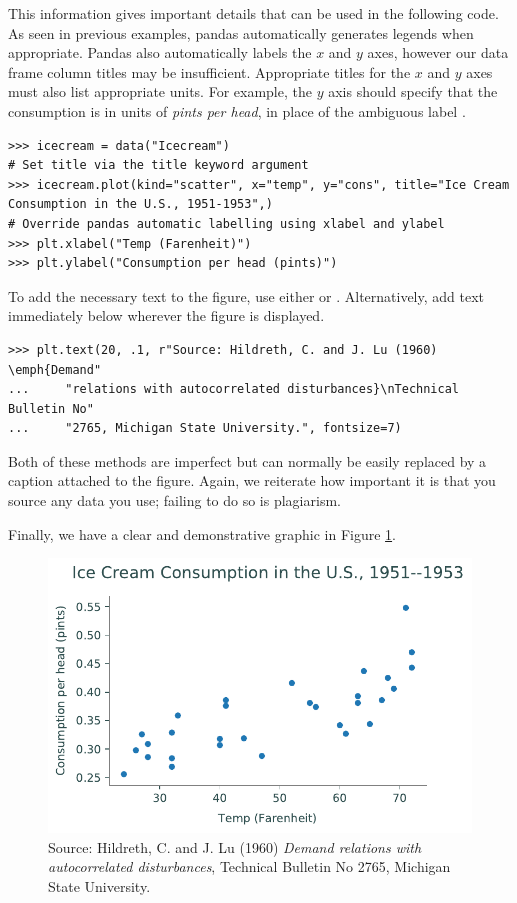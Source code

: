 This information gives important details that can be used in the following code.
As seen in previous examples, pandas automatically generates legends when appropriate.
Pandas also automatically labels the $x$ and $y$ axes, however our data frame column titles may be insufficient.
Appropriate titles for the $x$ and $y$ axes must also list appropriate units.
For example, the $y$ axis should specify that the consumption is in units of \emph{pints per head}, in place of the ambiguous label .

\begin{lstlisting}
>>> icecream = data("Icecream")
# Set title via the title keyword argument
>>> icecream.plot(kind="scatter", x="temp", y="cons", title="Ice Cream Consumption in the U.S., 1951-1953",)
# Override pandas automatic labelling using xlabel and ylabel
>>> plt.xlabel("Temp (Farenheit)")
>>> plt.ylabel("Consumption per head (pints)")
\end{lstlisting}

To add the necessary text to the figure, use either  or .
Alternatively, add text immediately below wherever the figure is displayed.

\begin{lstlisting}
>>> plt.text(20, .1, r"Source: Hildreth, C. and J. Lu (1960) \emph{Demand"
...     "relations with autocorrelated disturbances}\nTechnical Bulletin No"
...     "2765, Michigan State University.", fontsize=7)
\end{lstlisting}

Both of these methods are imperfect but can normally be easily replaced by a caption attached to the figure.
Again, we reiterate how important it is that you source any data you use; failing to do so is plagiarism.

Finally, we have a clear and demonstrative graphic in Figure \ref{fig:labels}.

\begin{figure}[H]
    \centering
    \includegraphics[width=.7\textwidth]{figures/ice_cream_good.pdf}
    \caption{Source:  Hildreth, C. and J. Lu (1960) \emph{Demand relations with autocorrelated disturbances}, Technical Bulletin No 2765, Michigan State University.}
    \label{fig:labels}
\end{figure}

